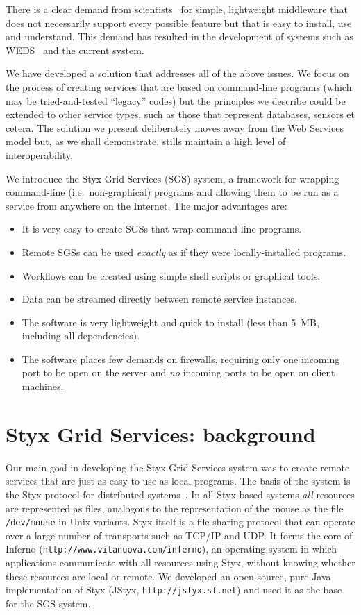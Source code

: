 \documentclass{llncs}
\begin{document}
There is a clear demand from scientists~\cite{chin:2004} for simple, lightweight middleware that does not necessarily support every possible feature but that is easy to install, use and understand.  This demand has resulted in the development of systems such as WEDS~\cite{weds} and the current system.

We have developed a solution that addresses all of the above issues.  We focus on the process of creating services that are based on command-line programs (which may be tried-and-tested ``legacy'' codes) but the principles we describe could be extended to other service types, such as those that represent databases, sensors et cetera.  The solution we present deliberately moves away from the Web Services model but, as we shall demonstrate, stills maintain a high level of interoperability.

We introduce the Styx Grid Services (SGS) system, a framework for wrapping command-line (i.e.\ non-graphical) programs and allowing them to be run as a service from anywhere on the Internet.  The major advantages are:
\begin{itemize}
  \item It is very easy to create SGSs that wrap command-line programs.
	\item Remote SGSs can be used {\em exactly\/} as if they were locally-installed programs.
	\item Workflows can be created using simple shell scripts or graphical tools.
	\item Data can be streamed directly between remote service instances.
	\item The software is very lightweight and quick to install (less than 5~MB, including all dependencies).
	\item The software places few demands on firewalls, requiring only one incoming port to be open on the server and {\em no\/} incoming ports to be open on client machines.
\end{itemize}


\section{Styx Grid Services: background}\label{sec:sgsoverview}
Our main goal in developing the Styx Grid Services system was to create remote services that are just as easy to use as local programs.  The basis of the system is the Styx protocol for distributed systems~\cite{Pike:1999}.  In all Styx-based systems {\em all\/} resources
are represented as files, analogous to the representation of the mouse as the file {\tt /dev/mouse} in Unix variants.  Styx itself is a file-sharing protocol that can operate over a large number of transports such as TCP/IP and UDP.  It forms the core of Inferno ({\tt http://www.vitanuova.com/inferno}), an operating system in which applications communicate with all resources using Styx, without knowing whether these resources are local or remote.  We developed an open source, pure-Java implementation of Styx (JStyx, {\tt http://jstyx.sf.net}) and used it as the base for the SGS system.
\end{document}
